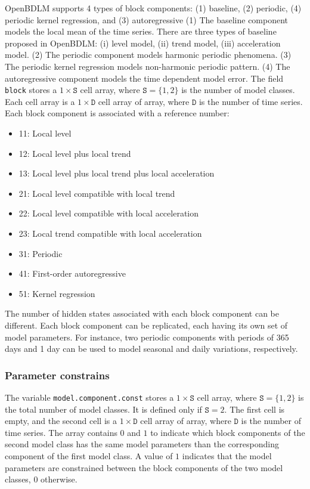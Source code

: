 OpenBDLM supports 4 types of block components: (1) baseline, (2) periodic, (4) periodic kernel regression, and (3) autoregressive 
(1) The baseline component models the local mean of the time series. 
There are three types of baseline proposed in OpenBDLM: (i) level model, (ii) trend model, (iii) acceleration model. 
(2) The periodic component models harmonic periodic phenomena. %
(3) The periodic kernel regression models non-harmonic periodic pattern.
(4) The autoregressive component models the time dependent model error.
The field \lstinline[basicstyle = \mlttfamily \small ]!block! stores a $1\times \mathtt{S}$ cell array, where $\mathtt{S} = \{1,2 \}$ is the number of model classes.
Each cell array is a $1\times \mathtt{D}$ cell array of array, where $\mathtt{D}$ is the number of time series.
Each block component is associated with a reference number:
\begin{itemize}
\item 11: Local level 
\item 12: Local level plus local trend
\item 13: Local level plus local trend plus local acceleration
\item 21: Local level compatible with local trend
\item 22: Local level compatible with local acceleration
\item 23: Local trend compatible with local acceleration
\item 31: Periodic
\item 41: First-order autoregressive
\item 51: Kernel regression
\end{itemize}
The number of hidden states associated with each block component can be different. 
Each block component can be replicated, each having its own set of model parameters. 
For instance, two periodic components with periods of 365 days and 1 day can be used to model seasonal and daily variations, respectively.

\subsubsection{Parameter constrains}

The variable \lstinline[basicstyle = \mlttfamily]!model.component.const! stores a $1\times \mathtt{S}$ cell array, where $\mathtt{S} = \{1, 2 \}$ is the total number of model classes.
It is defined only if $\mathtt{S} = 2$.
The first cell is empty, and the second cell is a $1\times \mathtt{D}$ cell array of array, where $\mathtt{D}$ is the number of time series.
The array contains $0$ and $1$ to indicate which block components of the second model class has the same model parameters than the corresponding component of the first model class. 
A value of $1$ indicates that the model parameters are constrained between the block components of the two model classes, $0$ otherwise.

